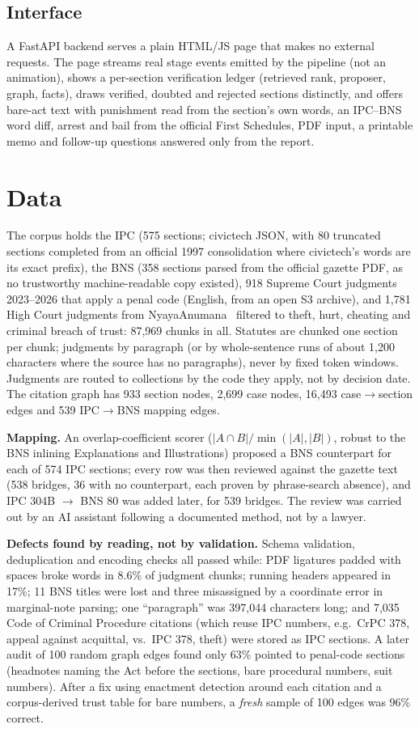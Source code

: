 \documentclass[conference]{IEEEtran}
\begin{document}
\subsection{Interface}
A FastAPI backend serves a plain HTML/JS page that makes no external requests. The page streams real stage events emitted by the pipeline (not an animation), shows a per-section verification ledger (retrieved rank, proposer, graph, facts), draws verified, doubted and rejected sections distinctly, and offers bare-act text with punishment read from the section's own words, an IPC--BNS word diff, arrest and bail from the official First Schedules, PDF input, a printable memo and follow-up questions answered only from the report.

\section{Data}\label{sec:data}
The corpus holds the IPC (575 sections; civictech JSON, with 80 truncated sections completed from an official 1997 consolidation where civictech's words are its exact prefix), the BNS (358 sections parsed from the official gazette PDF, as no trustworthy machine-readable copy existed), 918 Supreme Court judgments 2023--2026 that apply a penal code (English, from an open S3 archive), and 1,781 High Court judgments from NyayaAnumana~\cite{nyaya} filtered to theft, hurt, cheating and criminal breach of trust: 87,969 chunks in all. Statutes are chunked one section per chunk; judgments by paragraph (or by whole-sentence runs of about 1,200 characters where the source has no paragraphs), never by fixed token windows. Judgments are routed to collections by the code they apply, not by decision date. The citation graph has 933 section nodes, 2,699 case nodes, 16,493 case$\rightarrow$section edges and 539 IPC$\rightarrow$BNS mapping edges.

\textbf{Mapping.} An overlap-coefficient scorer ($|A\cap B|/\min(|A|,|B|)$, robust to the BNS inlining Explanations and Illustrations) proposed a BNS counterpart for each of 574 IPC sections; every row was then reviewed against the gazette text (538 bridges, 36 with no counterpart, each proven by phrase-search absence), and IPC 304B $\rightarrow$ BNS 80 was added later, for 539 bridges. The review was carried out by an AI assistant following a documented method, not by a lawyer.

\textbf{Defects found by reading, not by validation.} Schema validation, deduplication and encoding checks all passed while: PDF ligatures padded with spaces broke words in 8.6\% of judgment chunks; running headers appeared in 17\%; 11 BNS titles were lost and three misassigned by a coordinate error in marginal-note parsing; one ``paragraph'' was 397,044 characters long; and 7,035 Code of Criminal Procedure citations (which reuse IPC numbers, e.g.\ CrPC 378, appeal against acquittal, vs.\ IPC 378, theft) were stored as IPC sections. A later audit of 100 random graph edges found only 63\% pointed to penal-code sections (headnotes naming the Act before the sections, bare procedural numbers, suit numbers). After a fix using enactment detection around each citation and a corpus-derived trust table for bare numbers, a \emph{fresh} sample of 100 edges was 96\% correct.
\end{document}

